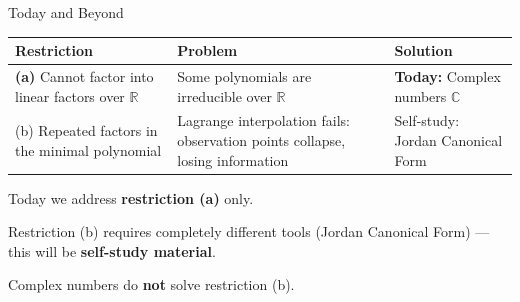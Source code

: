 \documentclass[10pt]{beamer}
\theoremstyle{definition}
\newcommand{\x}[1]{\alert{\textbf{#1}}}
\begin{document}
\begin{frame}{Today and Beyond}

\begin{center}
\renewcommand{\arraystretch}{1.5}
{\small
\begin{tabular}{p{3.2cm}|p{3.0cm}|p{3.0cm}}
Restriction & Problem & Solution \\
\hline
\x{(a)} Cannot factor into linear factors over $\mathbb{R}$ & Some polynomials are irreducible over $\mathbb{R}$ & \x{Today:} Complex numbers $\mathbb{C}$ \\
\hline
(b) Repeated factors in the minimal polynomial & Lagrange interpolation fails: observation points collapse, losing information & Self-study: Jordan Canonical Form
\end{tabular}
}
\end{center}

\vfill\pause

Today we address \x{restriction (a)} only.

\vfill

Restriction (b) requires completely different tools (Jordan Canonical Form) --- this will be \x{self-study material}.

\vfill

Complex numbers do \x{not} solve restriction (b).

\end{frame}
\end{document}
